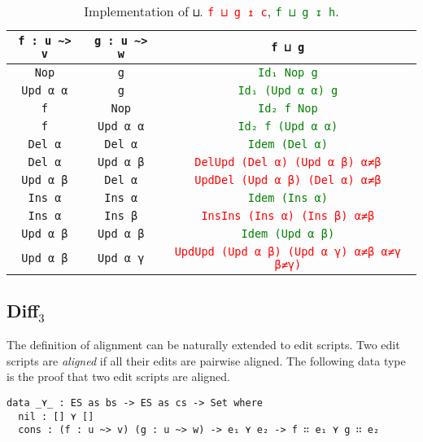 \documentclass[../Thesis.tex]{subfiles}
\begin{document}
	\begin{table}[h]
	\centering
	\begin{tabular}{| c | c | c |}
	\hline
	\texttt{f : u \textasciitilde> v} & \texttt{g : u \textasciitilde> w} &  \texttt{f ⊔ g} 
	\\ \hline
	\texttt{Nop} & \texttt{g} & \textcolor{Green}{\texttt{Id₁ Nop g}} 
	\\ \hline
	\texttt{Upd α α} & \texttt{g} & \textcolor{Green}{\texttt{Id₁ (Upd α α) g}} 
	\\ \hline
	\texttt{f} & \texttt{Nop} & \textcolor{Green}{\texttt{Id₂ f Nop}} 
	\\ \hline
	\texttt{f} & \texttt{Upd α α} & \textcolor{Green}{\texttt{Id₂ f (Upd α α)}} 
	\\ \hline
	\texttt{Del α} & \texttt{Del α} & \textcolor{Green}{\texttt{Idem (Del α)}}
	\\ \hline
	\texttt{Del α} & \texttt{Upd α β} & \textcolor{Red}{\texttt{DelUpd (Del α) (Upd α β) α≠β}}
	\\ \hline
	\texttt{Upd α β} & \texttt{Del α} & \textcolor{Red}{\texttt{UpdDel (Upd α β) (Del α) α≠β}}
	\\ \hline
	\texttt{Ins α} & \texttt{Ins α} & \textcolor{Green}{\texttt{Idem (Ins α)}} 
	\\	\hline
	\texttt{Ins α} & \texttt{Ins β} & \textcolor{Red}{\texttt{InsIns (Ins α) (Ins β) α≠β}}
	\\	\hline
	\texttt{Upd α β} & \texttt{Upd α β} & \textcolor{Green}{\texttt{Idem (Upd α β)}}
	\\	\hline
	\texttt{Upd α β} & \texttt{Upd α γ} & \textcolor{Red}{\texttt{UpdUpd (Upd α β) (Upd α γ) α≠β α≠γ β≠γ)}}
	\\ \hline
	\end{tabular}
	\caption{Implementation of \texttt{⊔}. \textcolor{Red}{\texttt{f ⊔ g ↥ c}}, \textcolor{Green}{\texttt{f ⊔ g ↧ h}}.}
	\label{table:merge}
	\end{table}		

	\subsection{Diff$_3$}
	\label{subsec:Diff3}
	The definition of alignment can be naturally extended to edit scripts.
	Two edit scripts are \emph{aligned} if all their edits are pairwise aligned.	
	The following data type is the proof that two edit scripts are aligned.	

\begin{verbatim}
data _⋎_ : ES as bs -> ES as cs -> Set where
  nil : [] ⋎ []
  cons : (f : u ~> v) (g : u ~> w) -> e₁ ⋎ e₂ -> f ∷ e₁ ⋎ g ∷ e₂ 
\end{verbatim}
\end{document}
